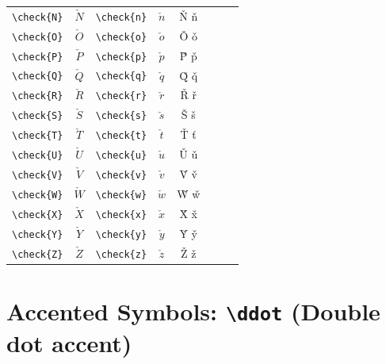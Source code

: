 \documentclass[12pt,a4paper]{article}
\begin{document}
\begin{longtable}{|l|c|l|c|c|l|c|c|}
\verb|\check{N}| & $\check{N}$     & \verb|\check{n}| & $\check{n}$     & Ň ň            &                  &                 & \\
\verb|\check{O}| & $\check{O}$     & \verb|\check{o}| & $\check{o}$     & Ǒ ǒ            &                  &                 & \\
\verb|\check{P}| & $\check{P}$     & \verb|\check{p}| & $\check{p}$     & P̌ p̌            &                  &                 & \\
\verb|\check{Q}| & $\check{Q}$     & \verb|\check{q}| & $\check{q}$     & Q̌ q̌            &                  &                 & \\
\verb|\check{R}| & $\check{R}$     & \verb|\check{r}| & $\check{r}$     & Ř ř            &                  &                 & \\
\verb|\check{S}| & $\check{S}$     & \verb|\check{s}| & $\check{s}$     & Š š            &                  &                 & \\
\verb|\check{T}| & $\check{T}$     & \verb|\check{t}| & $\check{t}$     & Ť ť            &                  &                 & \\
\verb|\check{U}| & $\check{U}$     & \verb|\check{u}| & $\check{u}$     & Ǔ ǔ            &                  &                 & \\
\verb|\check{V}| & $\check{V}$     & \verb|\check{v}| & $\check{v}$     & V̌ v̌            &                  &                 & \\
\verb|\check{W}| & $\check{W}$     & \verb|\check{w}| & $\check{w}$     & W̌ w̌            &                  &                 & \\
\verb|\check{X}| & $\check{X}$     & \verb|\check{x}| & $\check{x}$     & X̌ x̌            &                  &                 & \\
\verb|\check{Y}| & $\check{Y}$     & \verb|\check{y}| & $\check{y}$     & Y̌ y̌            &                  &                 & \\
\verb|\check{Z}| & $\check{Z}$     & \verb|\check{z}| & $\check{z}$     & Ž ž            &                  &                 & \\
\hline
\end{longtable}

\newpage

\section*{Accented Symbols: \texttt{\textbackslash ddot} (Double dot accent)}
\end{document}

